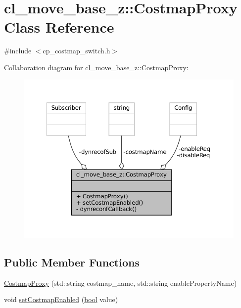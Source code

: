 \hypertarget{classcl__move__base__z_1_1CostmapProxy}{}\section{cl\+\_\+move\+\_\+base\+\_\+z\+:\+:Costmap\+Proxy Class Reference}
\label{classcl__move__base__z_1_1CostmapProxy}


{\ttfamily \#include $<$cp\+\_\+costmap\+\_\+switch.\+h$>$}



Collaboration diagram for cl\+\_\+move\+\_\+base\+\_\+z\+:\+:Costmap\+Proxy\+:
\nopagebreak
\begin{figure}[H]
\begin{center}
\leavevmode
\includegraphics[width=350pt]{classcl__move__base__z_1_1CostmapProxy__coll__graph}
\end{center}
\end{figure}
\subsection*{Public Member Functions}
\begin{DoxyCompactItemize}
\item 
\hyperlink{classcl__move__base__z_1_1CostmapProxy_af72dea5a7a40c11023b220029d729f1f}{Costmap\+Proxy} (std\+::string costmap\+\_\+name, std\+::string enable\+Property\+Name)
\item 
void \hyperlink{classcl__move__base__z_1_1CostmapProxy_a0f5c70b124ffb8a28f1d36854c340206}{set\+Costmap\+Enabled} (\hyperlink{classbool}{bool} value)
\end{DoxyCompactItemize}
